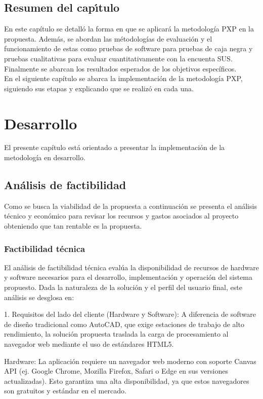 ﻿\documentclass{iccmemoria}
\begin{document}
\section{Resumen del capı́tulo}
En este capítulo se detalló la forma en que se aplicará la metodología PXP en la propuesta. Además, se abordan las métodologías de evaluación y el funcionamiento de estas como pruebas de software para pruebas de caja negra y pruebas cualitativas para evaluar cuantitativamente con la encuenta SUS. Finalmente se abarcan los resultados esperados de los objetivos específicos.\\
En el siguiente capítulo se abarca la implementación de la metodología PXP, siguiendo sus etapas y explicando que se realizó en cada una.


\chapter{Desarrollo}
El presente capítulo está orientado a presentar la implementación de la metodología en desarrollo.

\section{Análisis de factibilidad}
Como se busca la viabilidad de la propuesta a continuación se presenta el análisis técnico y económico para revisar los recursos y gastos asociados al proyecto obteniendo que tan rentable es la propuesta.

\subsection{Factibilidad técnica}
El análisis de factibilidad técnica evalúa la disponibilidad de recursos de hardware y software necesarios para el desarrollo, implementación y operación del sistema propuesto. Dada la naturaleza de la solución y el perfil del usuario final, este análisis se desglosa en:

1. Requisitos del lado del cliente (Hardware y Software):
A diferencia de software de diseño tradicional como AutoCAD, que exige estaciones de trabajo de alto rendimiento, la solución propuesta traslada la carga de procesamiento al navegador web mediante el uso de estándares HTML5.

Hardware: La aplicación requiere un navegador web moderno con soporte Canvas API (ej. Google Chrome, Mozilla Firefox, Safari o Edge en sus versiones actualizadas). Esto garantiza una alta disponibilidad, ya que estos navegadores son gratuitos y estándar en el mercado.
\end{document}

